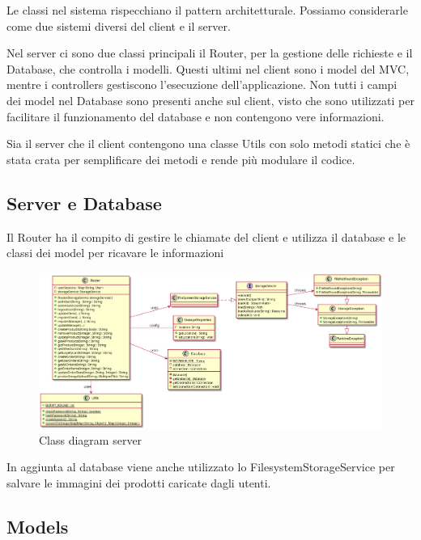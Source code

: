 \documentclass[12pt, a4paper]{article}
\begin{document}
Le classi nel sistema rispecchiano il pattern architetturale. Possiamo
considerarle come due sistemi diversi del client e il server. 

Nel server ci sono due classi principali il Router, per la gestione delle richieste
e il Database, che controlla i modelli. Questi ultimi nel client sono i model del
MVC, mentre i controllers gestiscono l'esecuzione dell'applicazione. Non tutti i campi
dei model nel Database sono presenti anche sul client, visto che sono utilizzati
per facilitare il funzionamento del database e non contengono vere informazioni.

Sia il server che il client contengono una classe Utils con solo metodi statici
che è stata crata per semplificare dei metodi e rende più modulare il codice.


\subsection{Server e Database}

Il Router ha il compito di gestire le chiamate del client e utilizza il database
e le classi dei model per ricavare le informazioni 

\begin{figure}[h]
\centering
\includegraphics[width=\textwidth]{router_class.png}
\caption{Class diagram server}
\end{figure}

In aggiunta al database viene anche utilizzato lo FilesystemStorageService per
salvare le immagini dei prodotti caricate dagli utenti.

\subsection{Models}
\end{document}
